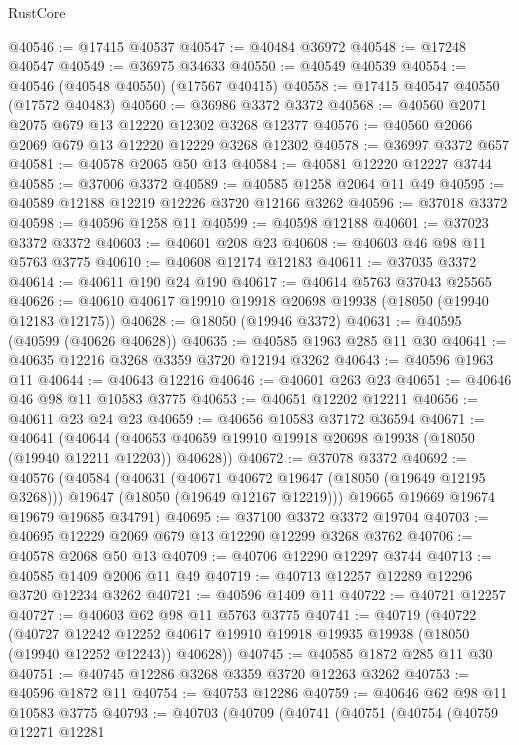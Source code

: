 \begin{lexlean}{RustCore}
\begin{coremodule}
@40546 := @17415 @40537
@40547 := @40484 @36972
@40548 := @17248 @40547
@40549 := @36975 @34633
@40550 := @40549 @40539
@40554 := @40546 (@40548 @40550) (@17567 @40415)
@40558 := @17415 @40547 @40550 (@17572 @40483)
@40560 := @36986 @3372 @3372
@40568 := @40560 @2071 @2075 @679 @13 @12220 @12302 @3268 @12377
@40576 := @40560 @2066 @2069 @679 @13 @12220 @12229 @3268 @12302
@40578 := @36997 @3372 @657
@40581 := @40578 @2065 @50 @13
@40584 := @40581 @12220 @12227 @3744
@40585 := @37006 @3372
@40589 := @40585 @1258 @2064 @11 @49
@40595 := @40589 @12188 @12219 @12226 @3720 @12166 @3262
@40596 := @37018 @3372
@40598 := @40596 @1258 @11
@40599 := @40598 @12188
@40601 := @37023 @3372 @3372
@40603 := @40601 @208 @23
@40608 := @40603 @46 @98 @11 @5763 @3775
@40610 := @40608 @12174 @12183
@40611 := @37035 @3372
@40614 := @40611 @190 @24 @190
@40617 := @40614 @5763 @37043 @25565
@40626 := @40610 @40617 @19910 @19918 @20698 @19938 (@18050 (@19940 @12183 @12175))
@40628 := @18050 (@19946 @3372)
@40631 := @40595 (@40599 (@40626 @40628))
@40635 := @40585 @1963 @285 @11 @30
@40641 := @40635 @12216 @3268 @3359 @3720 @12194 @3262
@40643 := @40596 @1963 @11
@40644 := @40643 @12216
@40646 := @40601 @263 @23
@40651 := @40646 @46 @98 @11 @10583 @3775
@40653 := @40651 @12202 @12211
@40656 := @40611 @23 @24 @23
@40659 := @40656 @10583 @37172 @36594
@40671 := @40641
    (@40644 (@40653 @40659 @19910 @19918 @20698 @19938 (@18050 (@19940 @12211 @12203)) @40628))
@40672 := @37078 @3372
@40692 := @40576
    (@40584
      (@40631
        (@40671 @40672 @19647 (@18050 (@19649 @12195 @3268)))
        @19647
        (@18050 (@19649 @12167 @12219)))
      @19665
      @19669
      @19674
      @19679
      @19685
      @34791)
@40695 := @37100 @3372 @3372 @19704
@40703 := @40695 @12229 @2069 @679 @13 @12290 @12299 @3268 @3762
@40706 := @40578 @2068 @50 @13
@40709 := @40706 @12290 @12297 @3744
@40713 := @40585 @1409 @2006 @11 @49
@40719 := @40713 @12257 @12289 @12296 @3720 @12234 @3262
@40721 := @40596 @1409 @11
@40722 := @40721 @12257
@40727 := @40603 @62 @98 @11 @5763 @3775
@40741 := @40719
    (@40722
      (@40727
        @12242
        @12252
        @40617
        @19910
        @19918
        @19935
        @19938
        (@18050 (@19940 @12252 @12243))
        @40628))
@40745 := @40585 @1872 @285 @11 @30
@40751 := @40745 @12286 @3268 @3359 @3720 @12263 @3262
@40753 := @40596 @1872 @11
@40754 := @40753 @12286
@40759 := @40646 @62 @98 @11 @10583 @3775
@40793 := @40703
    (@40709
      (@40741
        (@40751
          (@40754
            (@40759
              @12271
              @12281

\end{coremodule}
\end{lexlean}
